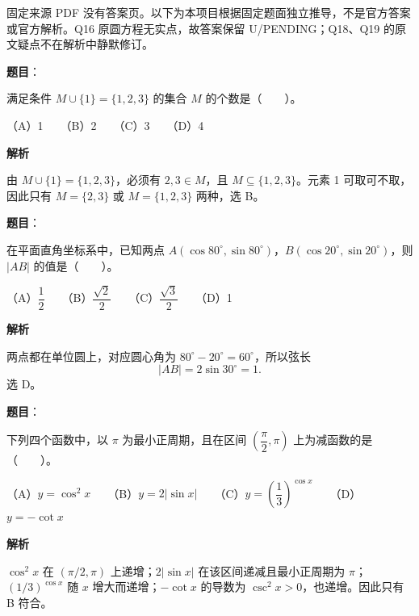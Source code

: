 

\begin{gktip}
固定来源 PDF 没有答案页。以下为本项目根据固定题面独立推导，不是官方答案或官方解析。Q16 原圆方程无实点，故答案保留 U/PENDING；Q18、Q19 的原文疑点不在解析中静默修订。
\end{gktip}


\begin{answer}

\textbf{题目}：

满足条件 \(M\cup\{1\}=\{1,2,3\}\) 的集合 \(M\) 的个数是\mbox{（　　）}。

（A）1　　（B）2　　（C）3　　（D）4

\textbf{解析}

由 \(M\cup\{1\}=\{1,2,3\}\)，必须有 \(2,3\in M\)，且 \(M\subseteq\{1,2,3\}\)。元素 1 可取可不取，因此只有 \(M=\{2,3\}\) 或 \(M=\{1,2,3\}\) 两种，选 B。


\end{answer}
\begin{answer}

\textbf{题目}：

在平面直角坐标系中，已知两点 \(A(\cos80^\circ,\sin80^\circ)\)，\(B(\cos20^\circ,\sin20^\circ)\)，则 \(|AB|\) 的值是\mbox{（　　）}。

（A）\(\dfrac12\)　　（B）\(\dfrac{\sqrt2}{2}\)　　（C）\(\dfrac{\sqrt3}{2}\)　　（D）1

\textbf{解析}

两点都在单位圆上，对应圆心角为 \(80^\circ-20^\circ=60^\circ\)，所以弦长
\nopagebreak[4]
\[
|AB|=2\sin30^\circ=1.
\]
选 D。


\end{answer}
\begin{answer}

\textbf{题目}：

下列四个函数中，以 \(\pi\) 为最小正周期，且在区间 \(\left(\dfrac\pi2,\pi\right)\) 上为减函数的是\mbox{（　　）}。

（A）\(y=\cos^2x\)　　（B）\(y=2|\sin x|\)　　（C）\(y=\left(\dfrac13\right)^{\cos x}\)　　（D）\(y=-\cot x\)

\textbf{解析}

\(\cos^2x\) 在 \((\pi/2,\pi)\) 上递增；\(2|\sin x|\) 在该区间递减且最小正周期为 \(\pi\)；\((1/3)^{\cos x}\) 随 \(x\) 增大而递增；\(-\cot x\) 的导数为 \(\csc^2x>0\)，也递增。因此只有 B 符合。


\end{answer}
